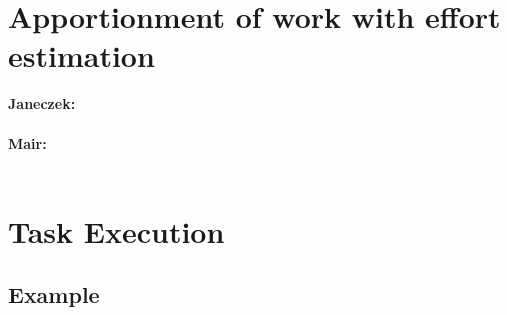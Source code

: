 \documentclass[11pt,a4paper]{article}
\begin{document}
\newpage
\section{Apportionment of work with effort estimation}

\textbf{Janeczek:} \\ \\
\textbf{Mair:} \\ \\

\newpage
\section{Task Execution}
\subsection{Example}

\newpage
\end{document}
